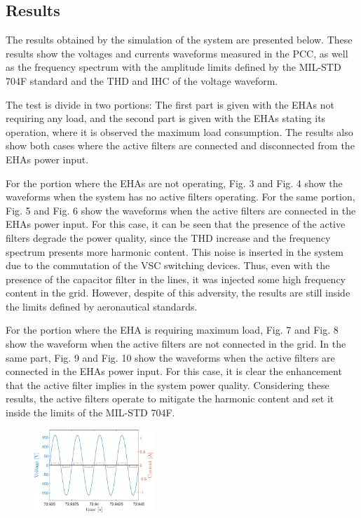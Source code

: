 \subsection{Results}

The results obtained by the simulation of the system are presented below. These results show the voltages and currents waveforms measured in the PCC, as well as the frequency spectrum with the amplitude limits defined by the MIL-STD 704F standard and the THD and IHC of the voltage waveform. 

The test is divide in two portions: The first part is given with the EHAs not requiring any load, and the second part is given with the EHAs stating its operation, where it is observed the maximum load consumption. The results also show both cases where the active filters are connected and disconnected from the EHAs power input.

For the portion where the EHAs are not operating, Fig. 3 and Fig. 4 show the waveforms when the system has no active filters operating. For the same portion, Fig. 5 and Fig. 6 show the waveforms when the active filters are connected in the EHAs power input. For this case, it can be seen that the presence of the active filters degrade the power quality, since the THD increase and the frequency spectrum presents more harmonic content. This noise is inserted in the system due to the commutation of the VSC switching devices. Thus, even with the presence of the capacitor filter in the lines, it was injected some high frequency content in the grid. However, despite of this adversity, the results are still inside the limits defined by aeronautical standards.

For the portion where the EHA is requiring maximum load, Fig. 7 and Fig. 8 show the waveform when the active filters are not connected in the grid. In the same part, Fig. 9 and Fig. 10 show the waveforms when the active filters are connected in the EHAs power input. For this case, it is clear the enhancement that the active filter implies in the system power quality. Considering these results, the active filters operate to mitigate the harmonic content and set it inside the limits of the MIL-STD 704F.

\begin{figure}[!b] %
	\centering
	\includegraphics[width=0.4\textwidth]{Figures/artigo_unfilt_1.eps}
	\caption{}
	\label{fig:artigo_unfilt_1.eps}
\end{figure}

